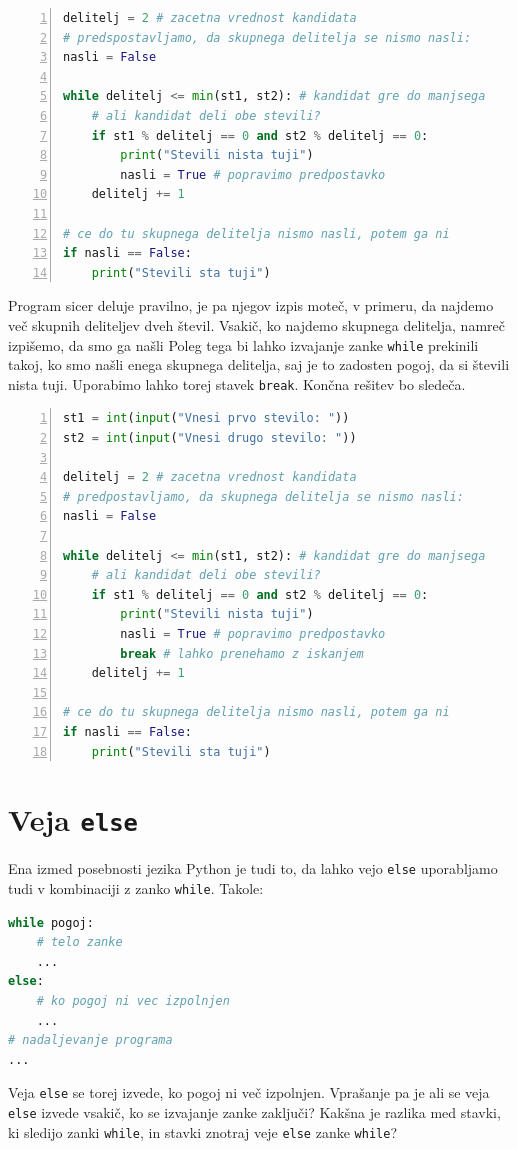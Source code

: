 \begin{resitev}
\begin{lstlisting}[language=Python, showstringspaces=false,numbers=left]
delitelj = 2 # zacetna vrednost kandidata
# predspostavljamo, da skupnega delitelja se nismo nasli:
nasli = False 

while delitelj <= min(st1, st2): # kandidat gre do manjsega
    # ali kandidat deli obe stevili?
    if st1 % delitelj == 0 and st2 % delitelj == 0:
        print("Stevili nista tuji")
        nasli = True # popravimo predpostavko
    delitelj += 1

# ce do tu skupnega delitelja nismo nasli, potem ga ni        
if nasli == False: 
    print("Stevili sta tuji")
\end{lstlisting}
Program sicer deluje pravilno, je pa njegov izpis moteč, v primeru, da najdemo več skupnih deliteljev dveh števil. Vsakič, ko najdemo skupnega delitelja, namreč izpišemo, da smo ga našli
Poleg tega bi lahko izvajanje zanke \texttt{while} prekinili takoj, ko smo našli enega skupnega delitelja, saj je to zadosten pogoj, da si števili nista tuji. Uporabimo lahko torej stavek \texttt{break}. Končna rešitev bo sledeča.
\begin{lstlisting}[language=Python, showstringspaces=false,numbers=left]
st1 = int(input("Vnesi prvo stevilo: "))
st2 = int(input("Vnesi drugo stevilo: "))

delitelj = 2 # zacetna vrednost kandidata
# predpostavljamo, da skupnega delitelja se nismo nasli:
nasli = False 

while delitelj <= min(st1, st2): # kandidat gre do manjsega
    # ali kandidat deli obe stevili?
    if st1 % delitelj == 0 and st2 % delitelj == 0:
        print("Stevili nista tuji")
        nasli = True # popravimo predpostavko
        break # lahko prenehamo z iskanjem
    delitelj += 1 

# ce do tu skupnega delitelja nismo nasli, potem ga ni        
if nasli == False: 
    print("Stevili sta tuji")
\end{lstlisting}
\end{resitev}

\section{Veja \texttt{else}}
Ena izmed posebnosti jezika Python je tudi to, da lahko vejo \texttt{else} uporabljamo tudi v kombinaciji z zanko \texttt{while}. Takole:
\begin{lstlisting}[language=Python, showstringspaces=false]
while pogoj:
    # telo zanke
    ...
else:
    # ko pogoj ni vec izpolnjen
    ...
# nadaljevanje programa
...
\end{lstlisting}
Veja \texttt{else} se torej izvede, ko pogoj ni več izpolnjen. Vprašanje pa je ali se veja \texttt{else} izvede vsakič, ko se izvajanje zanke zaključi? Kakšna je razlika med stavki, ki sledijo zanki \texttt{while}, in stavki znotraj veje \texttt{else} zanke \texttt{while}? 

